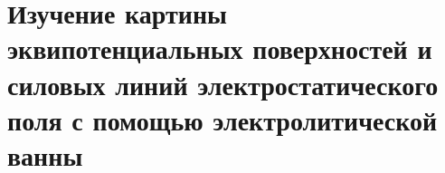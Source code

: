 \section{Изучение картины эквипотенциальных поверхностей и силовых линий электростатического поля с помощью электролитической ванны}